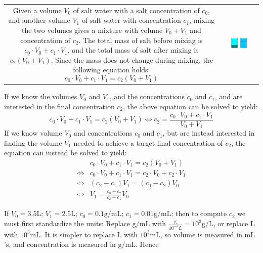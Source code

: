 \documentclass{article}
\begin{document}
\begin{tabular}{cc}
\parbox{0.5\textwidth}{
Given a volume \(V_0\) of salt water with a salt concentration of \(c_0\), and another volume \(V_1\) of salt water with concentration \(c_1\), mixing the two volumes gives a mixture with volume \(V_0 + V_1\) and concentration of \(c_2\). The total mass of salt before mixing is \(c_0 \cdot V_0 + c_1 \cdot V_1\), and the total mass of salt after mixing is \(c_2(V_0 + V_1)\). Since the mass does not change during mixing, the following equation holds:
\[c_0 \cdot V_0 + c_1 \cdot V_1 = c_2(V_0 + V_1)\]
} & \parbox{0.5\textwidth}{
\includegraphics[width = 0.5\textwidth]{mixing_example}
}
\end{tabular}
If we know the volumes \(V_0\) and \(V_1\), and the concentrations \(c_0\) and \(c_1\), and are interested in the final concentration \(c_2\), the above equation can be solved to yield: 
\[c_0 \cdot V_0 + c_1 \cdot V_1 = c_2(V_0 + V_1) \iff c_2 = \frac{c_0 \cdot V_0 + c_1 \cdot V_1}{V_0 + V_1}\]
If we know volume \(V_0\) and concentrations \(c_0\) and \(c_1\), but are instead interested in finding the volume \(V_1\) needed to achieve a target final concentration of \(c_2\), the equation can instead be solved to yield:
\begin{align*}
& c_0 \cdot V_0 + c_1 \cdot V_1 = c_2(V_0 + V_1) \\
\iff & c_0 \cdot V_0 + c_1 \cdot V_1 = c_2 \cdot V_0 + c_2 \cdot V_1 \\
\iff & (c_2 - c_1)V_1 = (c_0 - c_2)V_0 \\
\iff & V_1 = \frac{c_0 - c_2}{c_2 - c_1}V_0
\end{align*}

\vspace{5mm}

If \(V_0 = 3.5\text{L}\); \(V_1 = 2.5\text{L}\); \(c_0 = 0.1\text{g/mL}\); \(c_1 = 0.01\text{g/mL}\); then to compute \(c_2\) we must first standardize the units: Replace \(\text{g/mL}\) with \(\frac{\text{g}}{10^{-3}L} = 10^3\text{g/L}\), or replace \(\text{L}\) with \(10^3\text{mL}\). It is simpler to replace \(\text{L}\) with \(10^3\text{mL}\), so volume is measured in \(\text{mL}\)'s, and concentration is measured in \(\text{g/mL}\). Hence
\end{document}
